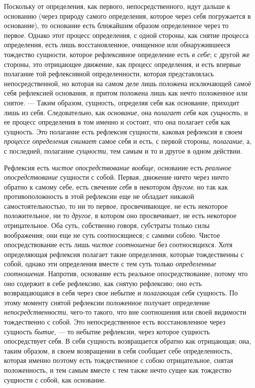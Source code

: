 Поскольку от определения, как первого, непосредственного, идут дальше к
основанию (через природу самого определения, которое через себя погружается
в основание), то основание есть ближайшим образом определенное через то
первое. Однако этот процесс определения, с одной стороны, как снятие
процесса определения, есть лишь восстановленное, очищенное или
обнаружившееся тождество сущности, которое рефлексивное определение есть
{\em в себе}; с другой же стороны, это отрицающее
движение, как процесс определения, и есть впервые полагание той
рефлексивной определенности, которая представлялась непосредственной, но
которая на самом деле лишь положена исключающей самоё себя рефлексией
основания, и притом положена лишь как нечто положенное или снятое. — Таким
образом, сущность, определяя себя как основание, приходит лишь из себя.
Следовательно, как {\em основание}, она
{\em полагает себя как сущность}, и ее процесс
определения в том именно и состоит, что она полагает себя как сущность. Это
полагание есть рефлексия сущности, каковая рефлексия в своем
{\em процессе определения снимает} самое себя и есть, с
первой стороны, {\em полагание}, а, с последней,
полагание {\em сущности}, тем самым и то и другое в
одном действии.

Рефлексия есть {\em чистое опосредствование вообще},
основание есть {\em реальное опосредствование} сущности
с собой. Первая, движение ничто через ничто обратно к самому себе, есть
свечение {\em себя} в некотором
{\em другом}; но так как противоположность в этой
рефлексии еще не обладает никакой самостоятельностью, то ни то первое,
просвечивающее, не есть некоторое положительное, ни то
{\em другое}, в котором оно просвечивает, не есть
некоторое отрицательное. Оба суть, собственно говоря, субстраты только силы
воображения; они еще не суть соотносящиеся; с самими собою. Чистое
опосредствование есть лишь {\em чистое соотношение} без
соотносящихся. Хотя определяющая рефлексия полагает такие определения,
которые тождественны с собой, однако эти определения вместе с тем суть
только {\em определенные соотношения}. Напротив,
основание есть реальное опосредствование, потому что оно содержит в себе
рефлексию, как снятую рефлексию; оно есть возвращающаяся в себя через свое
небытие и {\em полагающая себя} сущность. По этому
моменту снятой рефлексии положенное получает определение
{\em непосредственности}, чего-то такого, что вне
соотношения или своей видимости тождественно с собой. Это непосредственное
есть восстановленное через сущность {\em бытие}, — то
небытие рефлексии, через которое сущность опосредствует себя. В себя
сущность возвращается обратно как отрицающая; она, таким образом, в своем
возвращении в себя сообщает себе определенность, которая именно поэтому
есть тождественное с собою отрицательное, снятая положенность, и тем самым
вместе с тем также нечто сущее как тождество сущности с собой, как
основание.

